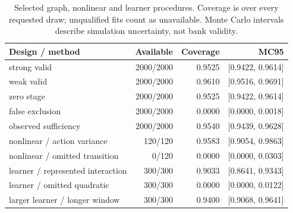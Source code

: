 \begin{table}[htbp]
\centering\small
\begin{tabular}{lrrr}
\toprule
Design / method & Available & Coverage & MC95 \\
\midrule
strong valid & 2000/2000 & 0.9525 & [0.9422, 0.9614] \\
weak valid & 2000/2000 & 0.9610 & [0.9516, 0.9691] \\
zero stage & 2000/2000 & 0.9525 & [0.9422, 0.9614] \\
false exclusion & 2000/2000 & 0.0000 & [0.0000, 0.0018] \\
observed sufficiency & 2000/2000 & 0.9540 & [0.9439, 0.9628] \\
nonlinear / action variance & 120/120 & 0.9583 & [0.9054, 0.9863] \\
nonlinear / omitted transition & 0/120 & 0.0000 & [0.0000, 0.0303] \\
learner / represented interaction & 300/300 & 0.9033 & [0.8641, 0.9343] \\
learner / omitted quadratic & 300/300 & 0.0000 & [0.0000, 0.0122] \\
larger learner / longer window & 300/300 & 0.9400 & [0.9068, 0.9641] \\
\bottomrule
\end{tabular}
\caption{Selected graph, nonlinear and learner procedures. Coverage is over every requested draw; unqualified fits count as unavailable. Monte Carlo intervals describe simulation uncertainty, not bank validity.}
\label{r8:extension-table}
\end{table}

